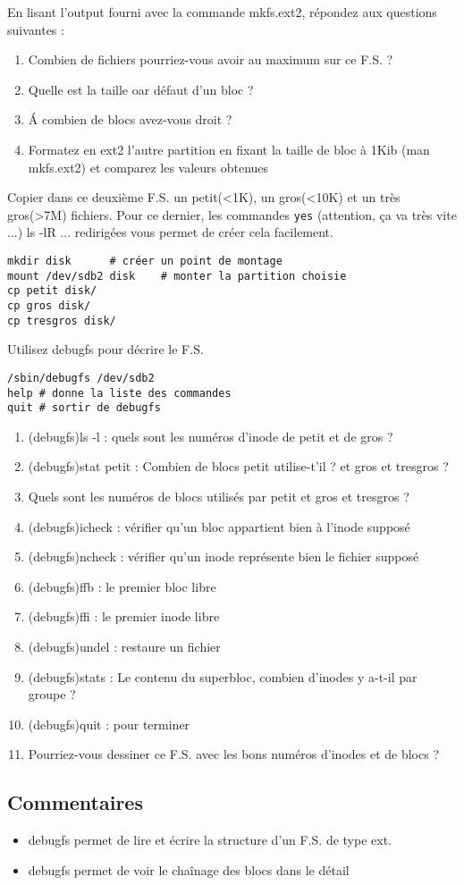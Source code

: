 En lisant l'output fourni avec la commande mkfs.ext2, répondez aux questions suivantes : 
\begin{enumerate}
\item Combien de fichiers pourriez-vous avoir au maximum sur ce F.S. ?
\item Quelle est la taille oar défaut d'un bloc ?
\item Á combien de blocs avez-vous droit ?
\item Formatez en ext2 l'autre partition en fixant la taille de bloc à 1Kib (man mkfs.ext2) et comparez les valeurs obtenues
\end{enumerate}

Copier dans ce deuxième F.S. un petit(<1K),  un gros(<10K) et un très gros(>7M) fichiers. Pour ce dernier, les commandes \verb+yes+ (attention, ça va très vite ...) ls -lR ... redirigées vous permet de créer cela facilement.
\begin{lstlisting}
mkdir disk		# créer un point de montage
mount /dev/sdb2 disk	# monter la partition choisie
cp petit disk/
cp gros disk/
cp tresgros disk/
\end{lstlisting}

Utilisez debugfs pour décrire le F.S.

\begin{lstlisting}
/sbin/debugfs /dev/sdb2
help # donne la liste des commandes
quit # sortir de debugfs
\end{lstlisting}

\begin{enumerate}
\item (debugfs)ls -l : quels sont les numéros d'inode de petit et de gros ?
\item (debugfs)stat petit : Combien de blocs petit utilise-t'il ? et gros et tresgros ?
\item Quels sont les numéros de blocs utilisés par petit et gros et tresgros ?
\item (debugfs)icheck : vérifier qu'un bloc appartient bien à l'inode supposé
\item (debugfs)ncheck : vérifier qu'un inode représente bien le fichier supposé
\item (debugfs)ffb : le premier bloc libre
\item (debugfs)ffi : le premier inode libre
\item (debugfs)undel : restaure un fichier
\item (debugfs)stats : Le contenu du superbloc, combien d'inodes y a-t-il par groupe ?
\item (debugfs)quit : pour terminer
\item Pourriez-vous dessiner ce F.S. avec les bons numéros d'inodes et de blocs ?
\end{enumerate}


\subsection{Commentaires}

\begin{itemize}
\item debugfs permet de lire et écrire la structure d'un F.S. de type ext.
\item debugfs permet de voir le chaînage des blocs dans le détail
\end{itemize}

\newpage
